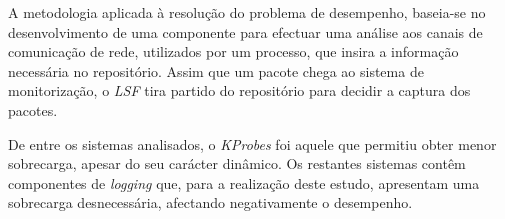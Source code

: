 




%
%


A metodologia aplicada à resolução do problema de desempenho, baseia-se no desenvolvimento de uma componente para efectuar uma análise aos canais de comunicação de rede, utilizados por um processo, que insira a informação necessária no repositório.
Assim que um pacote chega ao sistema de monitorização, o \textit{LSF} tira partido do repositório para decidir a captura dos pacotes.


De entre os sistemas analisados, o \textit{KProbes} foi aquele que permitiu obter menor sobrecarga, apesar do seu carácter dinâmico.
Os restantes sistemas contêm componentes de \textit{logging} que, para a realização deste estudo, apresentam uma sobrecarga desnecessária, afectando negativamente o desempenho.

